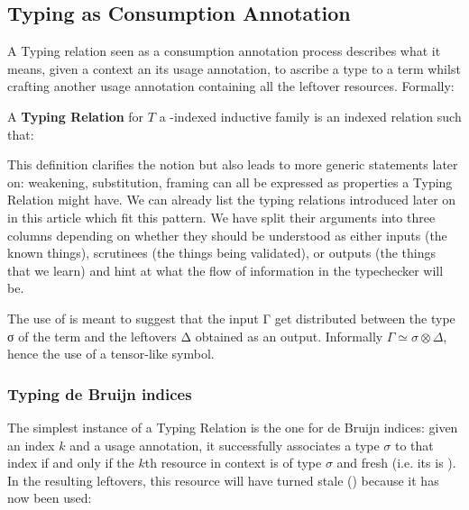 \subsection{Typing as Consumption Annotation}

A Typing relation seen as a consumption annotation process describes
what it means, given a context an its usage annotation, to ascribe a
type to a term whilst crafting another usage annotation containing all
the leftover resources. Formally:

\begin{definition}
\label{definition:typing}
A \textbf{Typing Relation} for $T$ a \Nat{}-indexed inductive family is
an indexed relation  such that:
\end{definition}

This definition clarifies the notion but also leads to more generic
statements later on: weakening, substitution, framing can all be
expressed as properties a Typing Relation might have. We can already
list the typing relations introduced later on in this article which
fit this pattern. We have split their arguments into three columns
depending on whether they should be understood as either inputs (the
known things), scrutinees (the things being validated), or outputs
(the things that we learn) and hint at what the flow of information
in the typechecker will be.



\begin{remark}The use of \andalso{} is meant to suggest that the input Γ
get distributed between the type σ of the term and the leftovers
Δ obtained as an output. Informally $Γ \simeq σ ⊗ Δ$, hence the
use of a tensor-like symbol.
\end{remark}

\subsubsection{Typing de Bruijn indices}

The simplest instance of a Typing Relation is the one for de Bruijn
indices: given an index $k$ and a usage annotation, it successfully
associates a type $σ$ to that index if and only if the $k$th resource
in context is of type $σ$ and fresh (i.e. its  is ).
In the resulting leftovers, this resource will have turned stale ()
because it has now been used:

